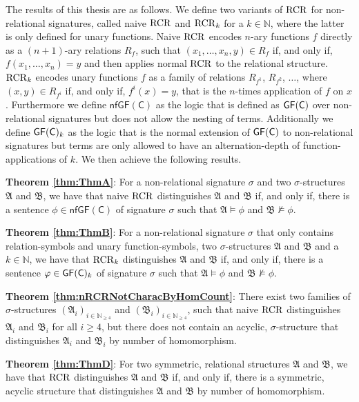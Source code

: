 The results of this thesis are as follows.
We define two variants of $\operatorname{RCR}$ for non-relational signatures, called naive $\operatorname{RCR}$ and $\operatorname{RCR}_k$ for a $k\in\mathbb{N}$, where the latter is only defined for unary functions.
Naive $\operatorname{RCR}$ encodes $n$-ary functions $f$ directly as a $(n+1)$-ary relations $R_f$, such that $(x_1,\dots,x_n,y)\in R_f$ if, and only if, $f(x_1,\dots,x_n)=y$ and then applies normal $\operatorname{RCR}$ to the relational structure.
$\operatorname{RCR}_k$ encodes unary functions $f$ as a family of relations $R_{f^1}$, $R_{f^2}$, $\dots$, where $(x,y)\in R_{f^i}$ if, and only if, $f^i(x)=y$, that is the $n$-times application of $f$ on $x$.
Furthermore we define $\mathsf{nfGF}(\mathsf C)$ as the logic that is defined as $\mathsf{GF}(\mathsf{C})$ over non-relational signatures but does not allow the nesting of terms. 
Additionally we define $\mathsf{GF}(\mathsf{C})_k$ as the logic that is the normal extension of $\mathsf{GF}(\mathsf{C})$ to non-relational signatures but terms are only allowed to have an alternation-depth of function-applications of $k$.
We then achieve the following results.

\textbf{Theorem \ref{thm:ThmA}}:
For a non-relational signature $\sigma$ and two $\sigma$-structures $\mathfrak A$ and $\mathfrak B$, we have that naive $\operatorname{RCR}$ distinguishes $\mathfrak A$ and $\mathfrak B$ if, and only if, there is a sentence $\phi\in \mathsf{nfGF}(\mathsf C)$ of signature $\sigma$ such that $\mathfrak A\models \phi$ and $\mathfrak B\not\models \phi$.

\textbf{Theorem \ref{thm:ThmB}}:
For a non-relational signature $\sigma$ that only contains relation-symbols and unary function-symbols, two $\sigma$-structures $\mathfrak A$ and $\mathfrak B$ and a $k\in\mathbb N$, we have that $\operatorname{RCR}_k$ distinguishes $\mathfrak A$ and $\mathfrak B$ if, and only if, there is a sentence $\varphi\in \mathsf{GF}(\mathsf{C})_k$ of signature $\sigma$ such that $\mathfrak A\models \phi$ and $\mathfrak B\not\models \phi$.

\textbf{Theorem \ref{thm:nRCRNotCharacByHomCount}}:
There exist two families of $\sigma$-structures $(\mathfrak A_i)_{i\in\mathbb N_{\geq 4}}$ and $(\mathfrak B_i)_{i\in\mathbb N_{\geq 4}}$, such that naive $\operatorname{RCR}$ distinguishes $\mathfrak A_i$ and $\mathfrak B_i$ for all $i\geq4$, but there does not contain an acyclic, $\sigma$-structure that distinguishes $\mathfrak A_i$ and $\mathfrak B_i$ by number of homomorphism.

\textbf{Theorem \ref{thm:ThmD}}:
For two symmetric, relational structures $\mathfrak A$ and $\mathfrak B$, we have that $\operatorname{RCR}$ distinguishes $\mathfrak A$ and $\mathfrak B$ if, and only if, there is a symmetric, acyclic structure that distinguishes $\mathfrak A$ and $\mathfrak B$ by number of homomorphism.

